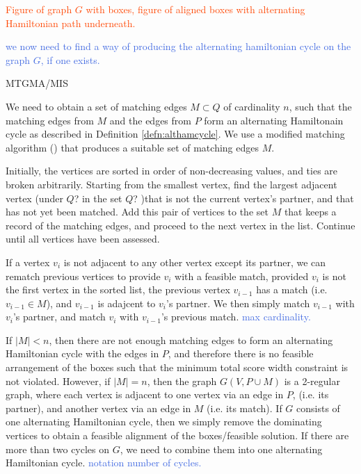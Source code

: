 \documentclass[oribibl]{llncs}
\begin{document}
\textcolor{OrangeRed}{Figure of graph $G$ with boxes, figure of aligned boxes with alternating Hamiltonian path underneath.}

\textcolor{RoyalBlue}{we now need to find a way of producing the alternating hamiltonian cycle on the graph $G$, if one exists.}

MTGMA/MIS

We need to obtain a set of matching edges $M \subset Q$ of cardinality $n$, such that the matching edges from $M$ and the edges from $P$ form an alternating Hamiltonain cycle as described in Definition \ref{defn:althamcycle}. We use a modified matching algorithm (\citealp{mahadev1994, becker2010}) that produces a suitable set of matching edges $M$. 

Initially, the vertices are sorted in order of non-decreasing values, and ties are broken arbitrarily. Starting from the smallest vertex, find the largest adjacent vertex (under $Q$? in the set $Q$? )that is not the current vertex's partner, and that has not yet been matched. Add this pair of vertices to the set $M$ that keeps a record of the matching edges, and proceed to the next vertex in the list. Continue until all vertices have been assessed. 

If a vertex $v_i$ is not adjacent to any other vertex except its partner, we can rematch previous vertices to provide $v_i$ with a feasible match, provided $v_i$ is not the first vertex in the sorted list, the previous vertex $v_{i-1}$ has a match (i.e. $v_{i-1} \in M$), and $v_{i-1}$ is adajcent to $v_i$'s partner. We then simply match $v_{i-1}$ with $v_i$'s partner, and match $v_i$ with $v_{i-1}$'s previous match. \textcolor{RoyalBlue}{max cardinality.}

If $|M| < n$, then there are not enough matching edges to form an alternating Hamiltonian cycle with the edges in $P$, and therefore there is no feasible arrangement of the boxes such that the minimum total score width constraint is not violated. However, if $|M| = n$, then the graph $G(V, P \cup M)$ is a 2-regular graph, where each vertex is adjacent to one vertex via an edge in $P$, (i.e. its partner), and another vertex via an edge in $M$ (i.e. its match). If $G$ consists of one alternating Hamiltonian cycle, then we simply remove the dominating vertices to obtain a feasible alignment of the boxes/feasible solution. If there are more than two cycles on $G$, we need to combine them into one alternating Hamiltonian cycle. \textcolor{RoyalBlue}{notation number of cycles.}
\end{document}
